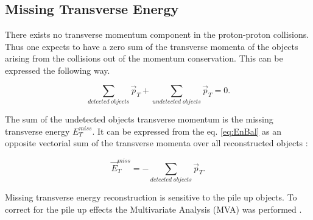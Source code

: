 \subsection{Missing Transverse Energy}

There exists no transverse momentum component in the proton-proton collisions. Thus one expects to have a zero sum of the transverse momenta of the 
objects arising from the collisions out of the momentum conservation. This can be expressed the following way.

\begin{equation}\label{eq:EnBal}
 \sum_{detected\; objects} \vec{p}_{T} + \sum_{undetected\; objects} \vec{p}_{T} = 0.
\end{equation}

The sum of the undetected objects transverse momentum is the missing transverse energy $E_{T}^{miss}$.
It can be expressed from the eq. \ref{eq:EnBal} as an opposite vectorial sum of the transverse momenta over all reconstructed objects \cite{CMS-PAS-PFT-09-001}:

\begin{equation}
 \vec{E}^{miss}_{T} = - \sum_{detected\; objects} \vec{p}_{T}.
\end{equation}


Missing transverse energy reconstruction is sensitive to the pile up objects. To correct for the 
pile up effects the Multivariate Analysis (MVA) was performed \cite{CMS-PAS-JME-12-002}.


